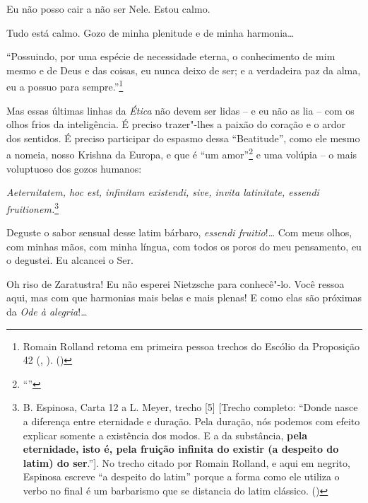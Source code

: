 Eu não posso cair a não ser Nele. Estou calmo.

Tudo está calmo. Gozo de minha plenitude e de minha harmonia\ldots{}

``Possuindo, por uma espécie de necessidade eterna, o conhecimento de
mim mesmo e de Deus e das coisas, eu nunca deixo de ser; e a verdadeira
paz da alma, eu a possuo para sempre.''\footnote{Romain Rolland retoma
  em primeira pessoa trechos do Escólio da Proposição 42 ({},
  \scalebox{0.8}{V}). (\scalebox{0.8}{N.~T.})}

Mas essas últimas linhas da \emph{Ética} não devem ser lidas -- e eu não
as lia -- com os olhos frios da inteligência. É preciso trazer"-lhes a
paixão do coração e o ardor dos sentidos. É preciso participar do
espasmo dessa ``Beatitude'', como ele mesmo a nomeia, nosso Krishna da
Europa, e que é ``um amor''\footnote{``{}''} e uma volúpia -- o mais voluptuoso dos gozos humanos:

\emph{Aeternitatem, hoc est, infinitam existendi, sive, invita
latinitate, essendi fruitionem.}\footnote{B. Espinosa, Carta 12 a L.
  Meyer, trecho {[}5{]} {[}Trecho completo: ``Donde nasce a diferença
  entre eternidade e duração. Pela duração, nós podemos com efeito
  explicar somente a existência dos modos. E a da substância,
  \textbf{pela eternidade, isto é, pela fruição infinita do existir (a
  despeito do latim) do ser}.''{]}. No trecho citado por Romain Rolland,
  e aqui em negrito, Espinosa escreve ``a despeito do latim'' porque a
  forma como ele utiliza o verbo {} no final é um barbarismo que
  se distancia do latim clássico. (\scalebox{0.8}{N.~T.})}

Deguste o sabor sensual desse latim bárbaro, \emph{essendi fruitio}!\ldots{}
Com meus olhos, com minhas mãos, com minha língua, com todos os poros do
meu pensamento, eu o degustei. Eu alcancei o Ser.

Oh riso de Zaratustra! Eu não esperei Nietzsche para conhecê"-lo. Você
ressoa aqui, mas com que harmonias mais belas e mais plenas! E como elas
são próximas da \emph{Ode à alegria}!\ldots{}


